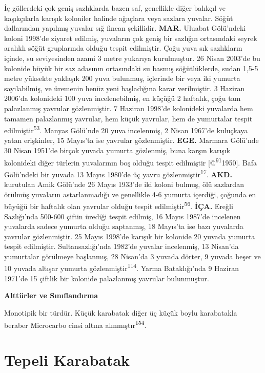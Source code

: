 \documentclass[
  letterpaper,
  DIV=11,
  numbers=noendperiod]{scrreprt}
\begin{document}
İç göllerdeki çok geniş sazlıklarda bazen saf, genellikle diğer balıkçıl
ve kaşıkçılarla karışık koloniler halinde ağaçlara veya sazlara yuvalar.
Söğüt dallarından yapılmış yuvalar sığ fincan şekillidir. \textbf{MAR.}
Uluabat Gölü'ndeki koloni 1998'de ziyaret edilmiş, yuvaların çok geniş
bir sazlığın ortasındaki seyrek aralıklı söğüt gruplarında olduğu tespit
edilmiştir. Çoğu yuva sık sazlıkların içinde, su seviyesinden azami 3
metre yukarıya kurulmuştur. 26 Nisan 2003'de bu kolonide büyük bir saz
adasının ortasındaki su basmış söğütlüklerde, sudan 1,5-5 metre yüksekte
yaklaşık 200 yuva bulunmuş, içlerinde bir veya iki yumurta sayılabilmiş,
ve üremenin henüz yeni başladığına karar verilmiştir. 3 Haziran 2006'da
kolonideki 100 yuva incelenebilmiş, en küçüğü 2 haftalık, çoğu tam
palazlanmış yavrular gözlenmiştir. 7 Haziran 1998'de kolonideki
yuvalarda hem tamamen palazlanmış yavrular, hem küçük yavrular, hem de
yumurtalar tespit edilmiştir\textsuperscript{53}. Manyas Gölü'nde 20
yuva incelenmiş, 2 Nisan 1967'de kuluçkaya yatan erişkinler, 15 Mayıs'ta
ise yavrular gözlenmiştir. \textbf{EGE.} Marmara Gölü'nde 30 Nisan
1951'de birçok yuvada yumurta gözlenmiş, buna karşın karışık kolonideki
diğer türlerin yuvalarının boş olduğu tespit edilmiştir
{[}@\textsuperscript{91}1950{]}. Bafa Gölü'ndeki bir yuvada 13 Mayıs
1980'de üç yavru gözlenmiştir\textsuperscript{17}. \textbf{AKD.}
kurutulan Amik Gölü'nde 26 Mayıs 1933'de iki koloni bulmuş, ölü
sazlardan örülmüş yuvaların astarlanmadığı ve genellikle 4-6 yumurta
içerdiği, çoğunda en büyüğü bir haftalık olan yavrular olduğu tespit
edilmiştir\textsuperscript{56}. \textbf{İÇA.} Ereğli Sazlığı'nda 500-600
çiftin ürediği tespit edilmiş, 16 Mayıs 1987'de incelenen yuvalarda
sadece yumurta olduğu saptanmış, 18 Mayıs'ta ise bazı yuvalarda yavrular
gözlenmiştir. 25 Mayıs 1998'de karışık bir kolonide 20 yuvada yumurta
tespit edilmiştir. Sultansazlığı'nda 1982'de yuvalar incelenmiş, 13
Nisan'da yumurtalar görülmeye başlanmış, 28 Nisan'da 3 yuvada dörter, 9
yuvada beşer ve 10 yuvada altışar yumurta
gözlenmiştir\textsuperscript{114}. Yarma Bataklığı'nda 9 Haziran 1971'de
15 çiftlik bir kolonide palazlanmış yavrular bulunmuştur.

\textbf{Alttürler ve Sınıflandırma}

Monotipik bir türdür. Küçük karabatak diğer üç küçük boylu karabatakla
beraber Microcarbo cinsi altına alınmıştır\textsuperscript{154}.

\section{Tepeli Karabatak}\label{tepeli-karabatak}
\end{document}
